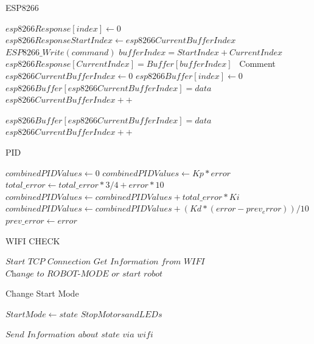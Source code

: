 \documentclass[12pt]{article}
\begin{document}
\begin{algorithm}
\caption{ESP8266}\label{euclid}
\begin{algorithmic}[1]
\Comment{}
    \State $esp8266Response[index] \gets 0$
\EndFor
\State $esp8266ResponseStartIndex \gets esp8266CurrentBufferIndex$
\State $ESP8266\_Write(command)$
\EndProcedure
{}\Comment{}
\For{;;}
    \State $bufferIndex = StartIndex + CurrentIndex$
    \State $esp8266Response[CurrentIndex] = Buffer[bufferIndex]$
    \EndFor
\EndFor
\EndProcedure
{}\ Comment{}
\State $esp8266CurrentBufferIndex \gets 0$
    \State $esp8266Buffer[index] \gets 0$
\EndFor
{}
        \State $esp8266Buffer[esp8266CurrentBufferIndex] = data $
        \State $esp8266CurrentBufferIndex++$
    \EndIf
\EndWhile
\EndProcedure

\Comment{}
        \State $esp8266Buffer[esp8266CurrentBufferIndex] = data $
        \State $esp8266CurrentBufferIndex++$
\EndIf
\EndProcedure
\end{algorithmic}
\end{algorithm}


\begin{algorithm}
\caption{PID}\label{euclid}
\begin{algorithmic}[1]
\Comment{}

\State $combinedPIDValues \gets 0$
\State $combinedPIDValues \gets Kp * error$
\State $total\_error \gets total\_error * 3 / 4 + error * 10$
\State $combinedPIDValues \gets combinedPIDValues + total\_error* Ki$
\State $combinedPIDValues \gets combinedPIDValues + (Kd * (error - prev_error)) / 10$
\State $prev\_error \gets error$

\EndProcedure
\end{algorithmic}
\end{algorithm}

\begin{algorithm}
\caption{WIFI CHECK}\label{euclid}
\begin{algorithmic}[1]
\Comment{}
    \State $\textit{Start TCP Connection}$
    \State $\textit{Get Information from WIFI}$
    \State $\textit{Change to ROBOT-MODE or start robot}$
\EndProcedure
\end{algorithmic}
\end{algorithm}

\begin{algorithm}
\caption{Change Start Mode}\label{euclid}
\begin{algorithmic}[1]
\Comment{}
    \State $StartMode \gets state$
    \State $Stop Motors and LEDs$
    
        \State $\textit{Send Information about state via wifi}$
    \EndIf
\EndProcedure
\end{algorithmic}
\end{algorithm}
\end{document}
